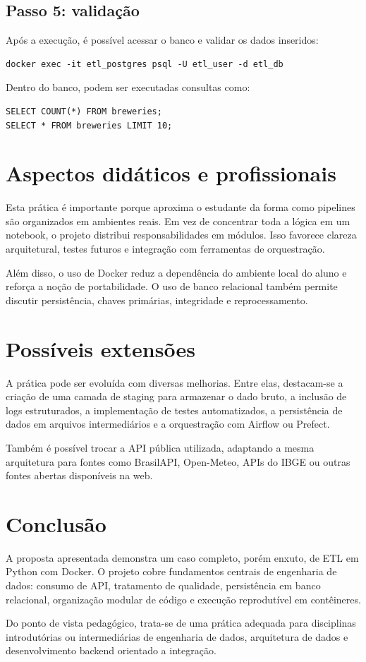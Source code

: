 \documentclass[12pt,a4paper]{article}
\begin{document}
\subsection{Passo 5: validação}
Após a execução, é possível acessar o banco e validar os dados inseridos:

\begin{lstlisting}
docker exec -it etl_postgres psql -U etl_user -d etl_db
\end{lstlisting}

Dentro do banco, podem ser executadas consultas como:

\begin{lstlisting}
SELECT COUNT(*) FROM breweries;
SELECT * FROM breweries LIMIT 10;
\end{lstlisting}

\section{Aspectos didáticos e profissionais}
Esta prática é importante porque aproxima o estudante da forma como pipelines são organizados em ambientes reais. Em vez de concentrar toda a lógica em um notebook, o projeto distribui responsabilidades em módulos. Isso favorece clareza arquitetural, testes futuros e integração com ferramentas de orquestração.

Além disso, o uso de Docker reduz a dependência do ambiente local do aluno e reforça a noção de portabilidade. O uso de banco relacional também permite discutir persistência, chaves primárias, integridade e reprocessamento.

\section{Possíveis extensões}
A prática pode ser evoluída com diversas melhorias. Entre elas, destacam-se a criação de uma camada de staging para armazenar o dado bruto, a inclusão de logs estruturados, a implementação de testes automatizados, a persistência de dados em arquivos intermediários e a orquestração com Airflow ou Prefect.

Também é possível trocar a API pública utilizada, adaptando a mesma arquitetura para fontes como BrasilAPI, Open-Meteo, APIs do IBGE ou outras fontes abertas disponíveis na web.

\section{Conclusão}
A proposta apresentada demonstra um caso completo, porém enxuto, de ETL em Python com Docker. O projeto cobre fundamentos centrais de engenharia de dados: consumo de API, tratamento de qualidade, persistência em banco relacional, organização modular de código e execução reprodutível em contêineres.

Do ponto de vista pedagógico, trata-se de uma prática adequada para disciplinas introdutórias ou intermediárias de engenharia de dados, arquitetura de dados e desenvolvimento backend orientado a integração.
\end{document}
